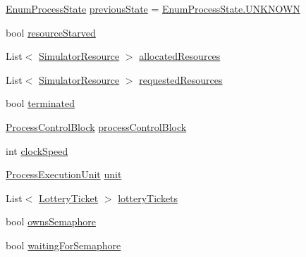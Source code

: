 \begin{DoxyCompactItemize}
\item 
\hyperlink{namespace_c_p_u___o_s___simulator_1_1_operating___system_a836ee2204e78fcb3a7dd6c3c942b1a24}{Enum\+Process\+State} \hyperlink{class_c_p_u___o_s___simulator_1_1_operating___system_1_1_simulator_process_a8caae45705ad80879dc7f28a9902f7c7}{previous\+State} = \hyperlink{namespace_c_p_u___o_s___simulator_1_1_operating___system_aea0b669d1bbf5690ae34ac2f8bef9470a696b031073e74bf2cb98e5ef201d4aa3}{Enum\+Process\+State.\+U\+N\+K\+N\+O\+W\+N}
\item 
bool \hyperlink{class_c_p_u___o_s___simulator_1_1_operating___system_1_1_simulator_process_af4d819f0ae416b254b00d1926568b564}{resource\+Starved}
\item 
List$<$ \hyperlink{class_c_p_u___o_s___simulator_1_1_operating___system_1_1_simulator_resource}{Simulator\+Resource} $>$ \hyperlink{class_c_p_u___o_s___simulator_1_1_operating___system_1_1_simulator_process_a9c087533fa8623d065681bf59d1d84a9}{allocated\+Resources}
\item 
List$<$ \hyperlink{class_c_p_u___o_s___simulator_1_1_operating___system_1_1_simulator_resource}{Simulator\+Resource} $>$ \hyperlink{class_c_p_u___o_s___simulator_1_1_operating___system_1_1_simulator_process_a9a1176ec569002f6779bcf894b4656ad}{requested\+Resources}
\item 
bool \hyperlink{class_c_p_u___o_s___simulator_1_1_operating___system_1_1_simulator_process_a692f144a0d21c56d067063d7c0207af1}{terminated}
\item 
\hyperlink{class_c_p_u___o_s___simulator_1_1_operating___system_1_1_process_control_block}{Process\+Control\+Block} \hyperlink{class_c_p_u___o_s___simulator_1_1_operating___system_1_1_simulator_process_a4b3401c13eab41dc43abd449e8961f18}{process\+Control\+Block}
\item 
int \hyperlink{class_c_p_u___o_s___simulator_1_1_operating___system_1_1_simulator_process_acb5b4680ab904693eb4b519c9f5e5e6e}{clock\+Speed}
\item 
\hyperlink{class_c_p_u___o_s___simulator_1_1_operating___system_1_1_process_execution_unit}{Process\+Execution\+Unit} \hyperlink{class_c_p_u___o_s___simulator_1_1_operating___system_1_1_simulator_process_a8e6c1d85ab2ff692572774c7590e5916}{unit}
\item 
List$<$ \hyperlink{class_c_p_u___o_s___simulator_1_1_operating___system_1_1_lottery_ticket}{Lottery\+Ticket} $>$ \hyperlink{class_c_p_u___o_s___simulator_1_1_operating___system_1_1_simulator_process_a23b5277b03356b9029312f13754ec37c}{lottery\+Tickets}
\item 
bool \hyperlink{class_c_p_u___o_s___simulator_1_1_operating___system_1_1_simulator_process_aac4edb775973bffaf74413b24de4903b}{owns\+Semaphore}
\item 
bool \hyperlink{class_c_p_u___o_s___simulator_1_1_operating___system_1_1_simulator_process_a42bc5de4072a7c1258a925cb97137f48}{waiting\+For\+Semaphore}
\end{DoxyCompactItemize}


